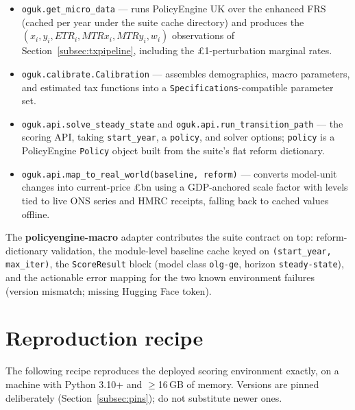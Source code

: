 \begin{itemize}
\item \texttt{oguk.get\_micro\_data} --- runs PolicyEngine UK over the enhanced FRS (cached per year under the suite cache directory) and produces the $(x_i, y_i, ETR_i, MTRx_i, MTRy_i, w_i)$ observations of Section~\ref{subsec:txpipeline}, including the \pounds 1-perturbation marginal rates.
\item \texttt{oguk.calibrate.Calibration} --- assembles demographics, macro parameters, and estimated tax functions into a \texttt{Specifications}-compatible parameter set.
\item \texttt{oguk.api.solve\_\allowbreak steady\_\allowbreak state} and \texttt{oguk.api.\allowbreak run\_\allowbreak transition\_\allowbreak path} --- the scoring API, taking \texttt{start\_year}, a \texttt{policy}, and solver options; \texttt{policy} is a PolicyEngine \texttt{Policy} object built from the suite's flat reform dictionary.
\item \texttt{oguk.api.map\_to\_real\_world(baseline, reform)} --- converts model-unit changes into current-price \pounds bn using a GDP-anchored scale factor with levels tied to live ONS series and HMRC receipts, falling back to cached values offline.
\end{itemize}
The \textbf{policyengine-macro} adapter contributes the suite contract on top: reform-dictionary validation, the module-level baseline cache keyed on \texttt{(start\_year, max\_iter)}, the \texttt{ScoreResult} block (model class \texttt{olg-ge}, horizon \texttt{steady-state}), and the actionable error mapping for the two known environment failures (version mismatch; missing Hugging Face token).

\section{Reproduction recipe}
\label{app:repro}

The following recipe reproduces the deployed scoring environment exactly, on a machine with Python 3.10+ and $\geq$16\,GB of memory. Versions are pinned deliberately (Section~\ref{subsec:pins}); do not substitute newer ones.

